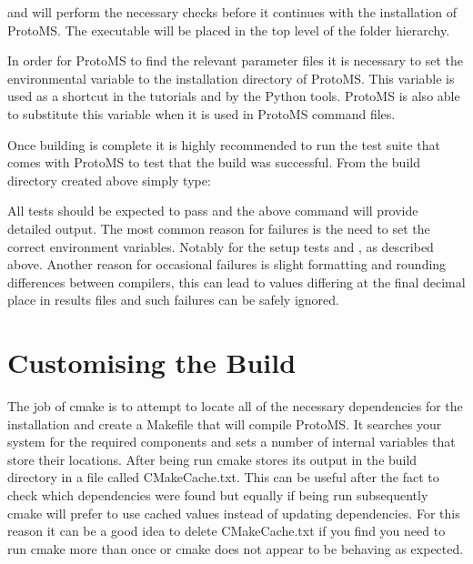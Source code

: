 \documentclass[letterpaper,10pt,english]{sphinxmanual}
\begin{document}
and  will perform the necessary checks before it continues with the installation of ProtoMS. The executable will be placed in the top level of the folder hierarchy.

In order for ProtoMS to find the relevant parameter files it is necessary to set the environmental variable  to the installation directory of ProtoMS. This variable is used as a shortcut in the tutorials and by the Python tools. ProtoMS is also able to substitute this variable when it is used in ProtoMS command files.

Once building is complete it is highly recommended to run the test suite that comes with ProtoMS to test that the build was successful. From the build directory created above simply type:

%
\begin{sphinxVerbatim}[commandchars=\\\{\}]
 
\end{sphinxVerbatim}

All tests should be expected to pass and the above command will provide detailed output. The most common reason for failures is the need to set the correct environment variables. Notably  for the setup tests and , as described above. Another reason for occasional failures is slight formatting and rounding differences between compilers, this can lead to values differing at the final decimal place in results files and such failures can be safely ignored.


\section{Customising the Build}
\label{\detokenize{compilation:custom-build}}\label{\detokenize{compilation:customising-the-build}}

The job of cmake is to attempt to locate all of the necessary dependencies for the installation and create a Makefile that will compile ProtoMS. It searches your system for the required components and sets a number of internal variables that store their locations. After being run cmake stores its output in the build directory in a file called CMakeCache.txt. This can be useful after the fact to check which dependencies were found but equally if being run subsequently cmake will prefer to use cached values instead of updating dependencies. For this reason it can be a good idea to delete CMakeCache.txt if you find you need to run cmake more than once or cmake does not appear to be behaving as expected.
\end{document}
